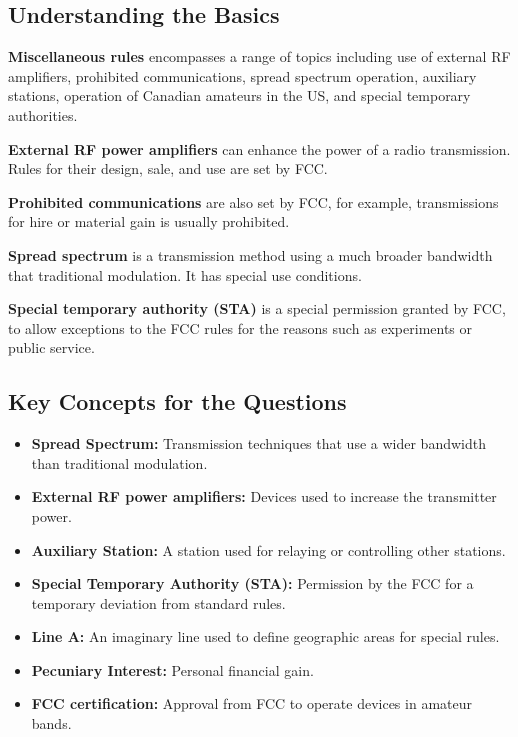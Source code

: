 \subsection*{Understanding the Basics}
  \textcolor{myblue}{\textbf{Miscellaneous rules}} encompasses a range of topics including use of external RF amplifiers, prohibited communications, spread spectrum operation, auxiliary stations, operation of Canadian amateurs in the US, and special temporary authorities.
  \par
 \textcolor{myblue}{\textbf{External RF power amplifiers}} can enhance the power of a radio transmission. Rules for their design, sale, and use are set by FCC.
   \par
  \textcolor{myblue}{\textbf{Prohibited communications}} are also set by FCC, for example, transmissions for hire or material gain is usually prohibited.
  \par
  \textcolor{myblue}{\textbf{Spread spectrum}} is a transmission method using a much broader bandwidth that traditional modulation. It has special use conditions.
\par
    \textcolor{myblue}{\textbf{Special temporary authority (STA)}} is a special permission granted by FCC, to allow exceptions to the FCC rules for the reasons such as experiments or public service.
  

\subsection*{Key Concepts for the Questions}
\begin{itemize}
        \item \textbf{Spread Spectrum:} Transmission techniques that use a wider bandwidth than traditional modulation.
      \item \textbf{External RF power amplifiers:} Devices used to increase the transmitter power.
          \item \textbf{Auxiliary Station:} A station used for relaying or controlling other stations.
    \item \textbf{Special Temporary Authority (STA):} Permission by the FCC for a temporary deviation from standard rules.
    \item \textbf{Line A:} An imaginary line used to define geographic areas for special rules.
    \item \textbf{Pecuniary Interest:} Personal financial gain.
       \item \textbf{FCC certification:} Approval from FCC to operate devices in amateur bands.
\end{itemize}

